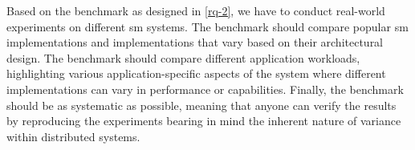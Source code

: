 \begin{enumerate}[label=\textbf{RQ\arabic*}, leftmargin=3\parindent]
    Based on the benchmark as designed in \ref{rq-2}, we have to conduct real-world experiments on different \gls{sm} systems. The benchmark should compare popular \gls{sm} implementations and implementations that vary based on their architectural design. The benchmark should compare different application workloads, highlighting various application-specific aspects of the system where different implementations can vary in performance or capabilities. Finally, the benchmark should be as systematic as possible, meaning that anyone can verify the results by reproducing the experiments bearing in mind the inherent nature of variance within distributed systems.

\end{enumerate}


